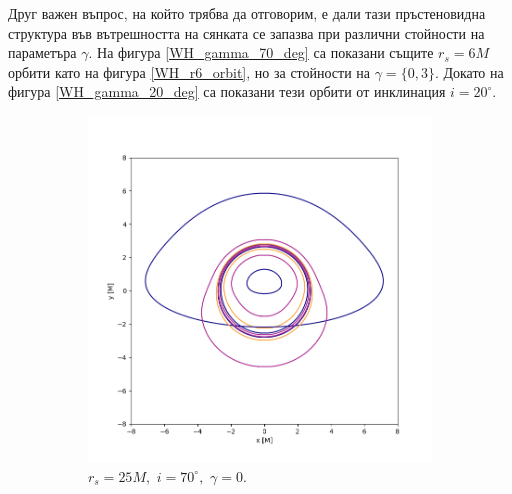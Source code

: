 Друг важен въпрос, на който трябва да отговорим, е дали тази пръстеновидна структура във вътрешността на сянката се запазва при различни стойности на параметъра $\gamma$. На фигура \ref{WH_gamma_70_deg} са показани същите $r_s = 6M$ орбити като на фигура \ref{WH_r6_orbit}, но за стойности на $\gamma =\{0, 3\}$. Докато на фигура \ref{WH_gamma_20_deg} са показани тези орбити от инклинация $i = 20^\circ$.
\newpage
\begin{figure}[!htb]
	\centering
	\begin{subfigure}{6cm}
		\hspace{-1.2cm}
		\includegraphics[scale = 0.35]{Wh_70_deg_r6_gamma_0.png}
		\caption{$r_s = 25M,\,\, i = 70^\circ,\,\,\gamma = 0$.} 
	\end{subfigure}\,\,\,
	\begin{subfigure}{6cm}
		\hspace{-0.7cm}

\end{subfigure}
\end{figure}
